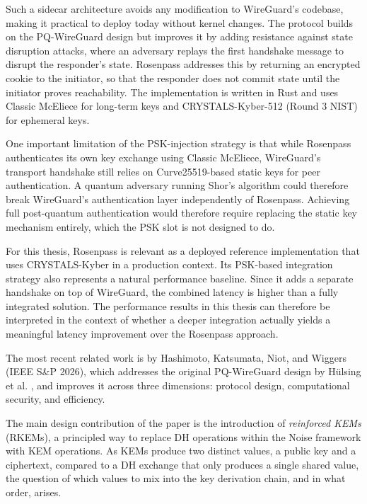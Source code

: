 Such a sidecar architecture avoids any modification to WireGuard's codebase, making it practical to deploy today without kernel changes. The protocol builds on the PQ-WireGuard design but improves it by adding resistance against state disruption attacks, where an adversary replays the first handshake message to disrupt the responder's state. Rosenpass addresses this by returning an encrypted cookie to the initiator, so that the responder does not commit state until the initiator proves reachability. The implementation is written in Rust and uses Classic McEliece for long-term keys and CRYSTALS-Kyber-512 (Round 3 NIST) for ephemeral keys.

One important limitation of the PSK-injection strategy is that while Rosenpass authenticates its own key exchange using Classic McEliece, WireGuard's transport handshake still relies on Curve25519-based static keys for peer authentication. A quantum adversary running Shor's algorithm could therefore break WireGuard's authentication layer independently of Rosenpass.
Achieving full post-quantum authentication would therefore require replacing the static key mechanism entirely, which the PSK slot is not designed to do.

For this thesis, Rosenpass is relevant as a deployed reference implementation that uses CRYSTALS-Kyber in a production context. Its PSK-based integration strategy also represents a natural performance baseline. Since it adds a separate handshake on top of WireGuard, the combined latency is higher than a fully integrated solution. The performance results in this thesis can therefore be interpreted in the context of whether a deeper integration actually yields a meaningful latency improvement over the Rosenpass approach.

The most recent related work is by Hashimoto, Katsumata, Niot, and Wiggers \cite{rebar} (IEEE S\&P 2026), which addresses the original PQ-WireGuard design by Hülsing et al. \cite{pqwg}, and improves it across three dimensions: protocol design, computational security, and efficiency.

The main design contribution of the paper is the introduction of \textit{reinforced KEMs} (RKEMs), a principled way to replace DH operations within the Noise framework with KEM operations. As KEMs produce two distinct values, a public key and a ciphertext, compared to a DH exchange that only produces a single shared value, the question of which values to mix into the key derivation chain, and in what order, arises.
 
